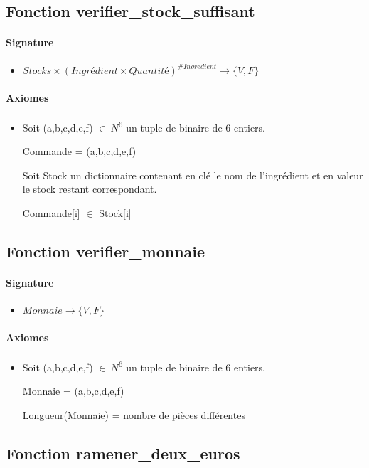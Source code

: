 \documentclass[]{article}
\begin{document}
\subsection*{Fonction verifier\_stock\_suffisant}
\paragraph{Signature}
\begin{itemize}
\item
  $Stocks \times (Ingrédient \times Quantité)^{\#Ingredient} \longrightarrow  \{V, F\}$
\end{itemize}
\paragraph{Axiomes}
\begin{itemize}
\item
  Soit (a,b,c,d,e,f) \(\in \ N\)\textsuperscript{6} un tuple de
  binaire de 6 entiers.

Commande = (a,b,c,d,e,f)

Soit Stock un dictionnaire contenant en clé le nom de l'ingrédient et en
valeur le stock restant correspondant.

Commande{[}i{]} \(\in \) Stock{[}i{]}
\end{itemize}

\subsection*{Fonction verifier\_monnaie}
\paragraph{Signature}
\begin{itemize}
\item
  $Monnaie \longrightarrow  \{V, F\}$
\end{itemize}
\paragraph{Axiomes}
\begin{itemize}
\item
 Soit (a,b,c,d,e,f) \(\in \ N\)\textsuperscript{6} un tuple de
  binaire de 6 entiers.

Monnaie = (a,b,c,d,e,f)

Longueur(Monnaie) = nombre de pièces différentes
\end{itemize}

\subsection*{Fonction ramener\_deux\_euros}
\end{document}
